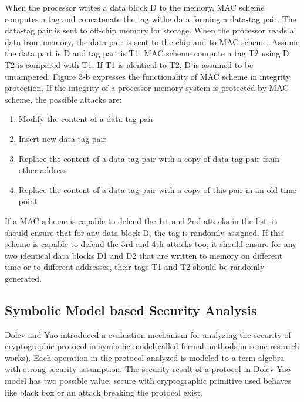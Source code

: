 \documentclass{article}
\begin{document}
When the processor writes a data block D to the memory, MAC scheme computes a tag  and concatenate the tag withe data forming a data-tag pair. The data-tag pair is sent to off-chip memory for storage.
When the processor reads a data from memory, the data-pair is sent to the chip and to MAC scheme. Assume the data part is D and tag part is T1. MAC scheme compute a tag T2 using D T2 is compared with T1. If T1 is identical to T2, D is assumed to be untampered.
 Figure 3-b expresses the functionality of MAC scheme in integrity protection.
If the integrity of a processor-memory system is protected by MAC scheme, the possible attacks are:
\begin{enumerate}
	\item Modify the content of a data-tag pair
	\item Insert new data-tag pair
	\item Replace the content of a data-tag pair with a copy of data-tag pair from other address
	\item Replace the content of a data-tag pair with a copy of this pair in an old time point
\end{enumerate}
If a MAC scheme is capable to defend the 1st and 2nd attacks in the list, it should ensure that for any data block D, the tag is randomly assigned. If this scheme is capable to defend the 3rd and 4th attacks too, it should ensure for any two identical data blocks D1 and D2 that are written to memory on different time or to different addresses, their tags T1 and T2 should be randomly generated.

\subsection{Symbolic Model based Security Analysis}
Dolev and Yao introduced \cite{Dolev-Yao} a evaluation mechanism for analyzing the security of cryptographic protocol in
symbolic model(called formal methods in some research works). Each operation in the protocol analyzed is modeled to a term
algebra with strong security assumption. The security result of a protocol in
Dolev-Yao model has two possible value: secure with cryptographic primitive used
behaves like black box or an attack breaking the protocol exist.  
\end{document}
